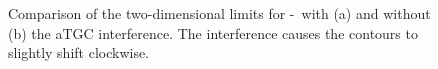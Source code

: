 \begin{figure}
	\centering
	\caption[Comparison of the two-dimensional limits for \Tccw -\Tcb \ with and without the aTGC interference]{Comparison of the two-dimensional limits for \Tccw -\Tcb \ with (a) and without (b) the aTGC interference. The interference causes the contours to slightly shift clockwise.}
	\label{fig:limits:noatgcint}
\end{figure}
